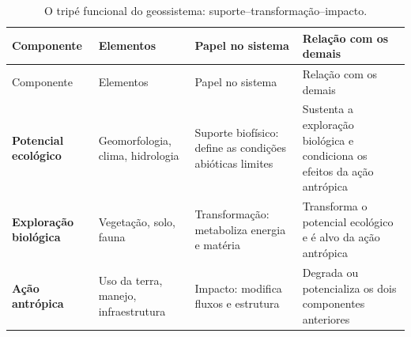 \documentclass[
  portuguese,
  11pt,
  a4paper,
  open=any]{scrbook}
\begin{document}
\begin{longtable}[]{@{}
  >{\raggedright\arraybackslash}p{}
  >{\raggedright\arraybackslash}p{}
  >{\raggedright\arraybackslash}p{}
  >{\raggedright\arraybackslash}p{}@{}}
\caption{O tripé funcional do geossistema:
suporte--transformação--impacto.}\label{tbl-tripe-geossistema}\tabularnewline
\toprule\noalign{}
\begin{minipage}[b]{\linewidth}\raggedright
Componente
\end{minipage} & \begin{minipage}[b]{\linewidth}\raggedright
Elementos
\end{minipage} & \begin{minipage}[b]{\linewidth}\raggedright
Papel no sistema
\end{minipage} & \begin{minipage}[b]{\linewidth}\raggedright
Relação com os demais
\end{minipage} \\
\midrule\noalign{}
\endfirsthead
\toprule\noalign{}
\begin{minipage}[b]{\linewidth}\raggedright
Componente
\end{minipage} & \begin{minipage}[b]{\linewidth}\raggedright
Elementos
\end{minipage} & \begin{minipage}[b]{\linewidth}\raggedright
Papel no sistema
\end{minipage} & \begin{minipage}[b]{\linewidth}\raggedright
Relação com os demais
\end{minipage} \\
\midrule\noalign{}
\endhead
\bottomrule\noalign{}
\endlastfoot
\textbf{Potencial ecológico} & Geomorfologia, clima, hidrologia &
Suporte biofísico: define as condições abióticas limites & Sustenta a
exploração biológica e condiciona os efeitos da ação antrópica \\
\textbf{Exploração biológica} & Vegetação, solo, fauna & Transformação:
metaboliza energia e matéria & Transforma o potencial ecológico e é alvo
da ação antrópica \\
\textbf{Ação antrópica} & Uso da terra, manejo, infraestrutura &
Impacto: modifica fluxos e estrutura & Degrada ou potencializa os dois
componentes anteriores \\
\end{longtable}
\end{document}
